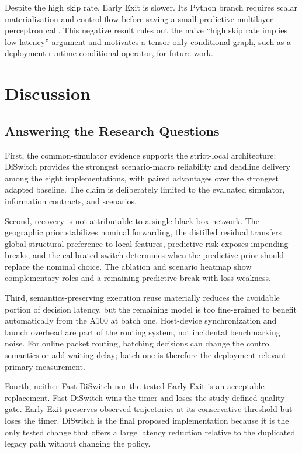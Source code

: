 \documentclass{ieeeaccess}
\newcommand{\DS}{DiSwitch}
\newcommand{\FastDS}{Fast-DiSwitch}
\begin{document}
Despite the high skip rate, Early Exit is slower. Its Python branch requires scalar materialization and control flow before saving a small predictive multilayer perceptron call. This negative result rules out the naive ``high skip rate implies low latency'' argument and motivates a tensor-only conditional graph, such as a deployment-runtime conditional operator, for future work.

\section{Discussion}

\subsection{Answering the Research Questions}

First, the common-simulator evidence supports the strict-local architecture: \DS{} provides the strongest scenario-macro reliability and deadline delivery among the eight implementations, with paired advantages over the strongest adapted baseline. The claim is deliberately limited to the evaluated simulator, information contracts, and scenarios.

Second, recovery is not attributable to a single black-box network. The geographic prior stabilizes nominal forwarding, the distilled residual transfers global structural preference to local features, predictive risk exposes impending breaks, and the calibrated switch determines when the predictive prior should replace the nominal choice. The ablation and scenario heatmap show complementary roles and a remaining predictive-break-with-loss weakness.

Third, semantics-preserving execution reuse materially reduces the avoidable portion of decision latency, but the remaining model is too fine-grained to benefit automatically from the A100 at batch one. Host-device synchronization and launch overhead are part of the routing system, not incidental benchmarking noise. For online packet routing, batching decisions can change the control semantics or add waiting delay; batch one is therefore the deployment-relevant primary measurement.

Fourth, neither \FastDS{} nor the tested Early Exit is an acceptable replacement. \FastDS{} wins the timer and loses the study-defined quality gate. Early Exit preserves observed trajectories at its conservative threshold but loses the timer. \DS{} is the final proposed implementation because it is the only tested change that offers a large latency reduction relative to the duplicated legacy path without changing the policy.
\end{document}
